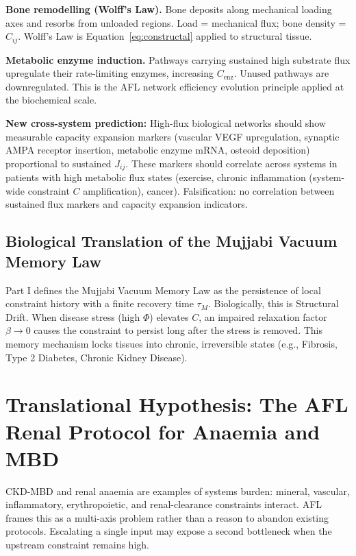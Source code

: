 \documentclass[12pt,a4paper]{article}
\begin{document}
\textbf{Bone remodelling (Wolff's Law).} Bone deposits along mechanical loading axes and resorbs from unloaded regions. Load = mechanical flux; bone density = $C_{ij}$. Wolff's Law is Equation~\eqref{eq:constructal} applied to structural tissue.

\textbf{Metabolic enzyme induction.} Pathways carrying sustained high substrate flux upregulate their rate-limiting enzymes, increasing $C_{\mathrm{enz}}$. Unused pathways are downregulated. This is the AFL network efficiency evolution principle applied at the biochemical scale.

\textbf{New cross-system prediction:} High-flux biological networks should show measurable capacity expansion markers (vascular VEGF upregulation, synaptic AMPA receptor insertion, metabolic enzyme mRNA, osteoid deposition) proportional to sustained $J_{ij}$. These markers should correlate across systems in patients with high metabolic flux states (exercise, chronic inflammation (system-wide constraint $C$ amplification), cancer). Falsification: no correlation between sustained flux markers and capacity expansion indicators.



\subsection{Biological Translation of the Mujjabi Vacuum Memory Law \cite{MujjabiPartI2026}}
Part I defines the Mujjabi Vacuum Memory Law \cite{MujjabiPartI2026} as the persistence of local constraint history with a finite recovery time $\tau_M$. Biologically, this is Structural Drift. When disease stress (high $\Phi$) elevates $C$, an impaired relaxation factor $\beta \to 0$ causes the constraint to persist long after the stress is removed. This memory mechanism locks tissues into chronic, irreversible states (e.g., Fibrosis, Type 2 Diabetes, Chronic Kidney Disease).



\section{Translational Hypothesis: The AFL Renal Protocol for Anaemia and MBD}
CKD-MBD and renal anaemia are examples of systems burden: mineral, vascular, inflammatory, erythropoietic, and renal-clearance constraints interact. AFL frames this as a multi-axis problem rather than a reason to abandon existing protocols. Escalating a single input may expose a second bottleneck when the upstream constraint remains high.
\end{document}
